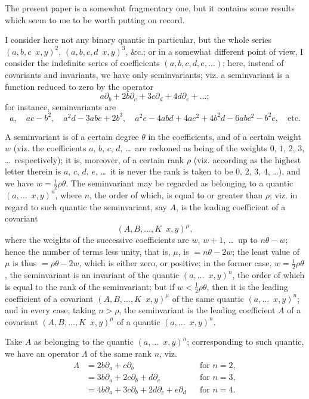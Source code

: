 \documentclass[11pt,a4paper]{article}
\theoremstyle{definition}
\theoremstyle{remark}
\begin{document}
The present paper is a somewhat fragmentary one, but it contains some results which seem to me to be worth putting on record.

I consider here not any binary quantic in particular, but the whole series $(a, b, c \!\!\!\! \,\,\, x, y)^2$, $(a, b, c, d \!\!\!\! \,\,\, x, y)^3$, \&c.; or in a somewhat different point of view, I consider the indefinite series of coefficients $(a, b, c, d, e, \ldots)$; here, instead of covariants and invariants, we have only seminvariants; viz. a seminvariant is a function reduced to zero by the operator
\[
a\partial_b + 2b\partial_c + 3c\partial_d + 4d\partial_e + \ldots;
\]
for instance, seminvariants are
\[
a, \quad ac - b^2, \quad a^2d - 3abc + 2b^3, \quad a^2e - 4abd + 4ac^2 + 4b^2d - 6abc^2 - b^2e, \quad \text{etc.}
\]

A seminvariant is of a certain degree $\theta$ in the coefficients, and of a certain weight $w$ (viz. the coefficients $a$, $b$, $c$, $d$, \ldots\ are reckoned as being of the weights $0$, $1$, $2$, $3$, \ldots\ respectively); it is, moreover, of a certain rank $\rho$ (viz. according as the highest letter therein is $a$, $c$, $d$, $e$, \ldots\ it is never the rank is taken to be $0$, $2$, $3$, $4$, \ldots), and we have $w = \frac{1}{2}\rho\theta$. The seminvariant may be regarded as belonging to a quantic $(a, \ldots \!\!\!\! \,\,\, x, y)^n$, where $n$, the order of which, is equal to or greater than $\rho$; viz. in regard to such quantic the seminvariant, say $A$, is the leading coefficient of a covariant
\[
(A, B, \ldots, K \!\!\!\! \,\,\, x, y)^\mu,
\]
where the weights of the successive coefficients are $w$, $w+1$, \ldots\ up to $n\theta - w$; hence the number of terms less unity, that is, $\mu$, is $= n\theta - 2w$; the least value of $\mu$ is thus $= \rho\theta - 2w$, which is either zero, or positive; in the former case, $w = \frac{1}{2}\rho\theta$, the seminvariant is an invariant of the quantic $(a, \ldots \!\!\!\! \,\,\, x, y)^n$, the order of which is equal to the rank of the seminvariant; but if $w < \frac{1}{2}\rho\theta$, then it is the leading coefficient of a covariant $(A, B, \ldots, K \!\!\!\! \,\,\, x, y)^\mu$ of the same quantic $(a, \ldots \!\!\!\! \,\,\, x, y)^n$; and in every case, taking $n > \rho$, the seminvariant is the leading coefficient $A$ of a covariant $(A, B, \ldots, K \!\!\!\! \,\,\, x, y)^\mu$ of a quantic $(a, \ldots \!\!\!\! \,\,\, x, y)^n$.

Take $A$ as belonging to the quantic $(a, \ldots \!\!\!\! \,\,\, x, y)^n$; corresponding to such quantic, we have an operator $\Lambda$ of the same rank $n$, viz.
\[
\begin{aligned}
\Lambda &= 2b\partial_a + c\partial_b && \text{for } n=2, \\
&= 3b\partial_a + 2c\partial_b + d\partial_c && \text{for } n=3, \\
&= 4b\partial_a + 3c\partial_b + 2d\partial_c + e\partial_d && \text{for } n=4.
\end{aligned}
\]
\end{document}
